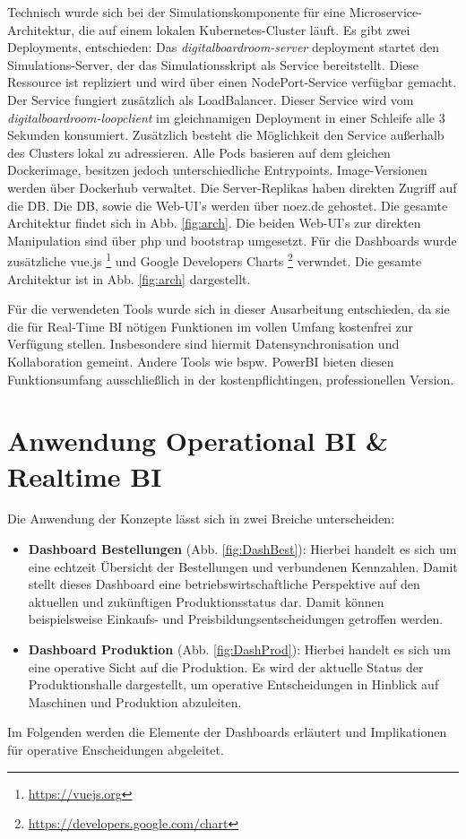 Technisch wurde sich bei der Simulationskomponente für eine Microservice-Architektur, die auf einem lokalen Kubernetes-Cluster läuft. Es gibt zwei Deployments, entschieden: Das \textit{digitalboardroom-server} deployment startet den Simulations-Server, der das Simulationsskript als Service bereitstellt. Diese Ressource ist repliziert und wird über einen NodePort-Service verfügbar gemacht. Der Service fungiert zusätzlich als LoadBalancer. Dieser Service wird vom \textit{digitalboardroom-loopclient} im gleichnamigen Deployment in einer Schleife alle 3 Sekunden konsumiert. Zusätzlich besteht die Möglichkeit den Service außerhalb des Clusters lokal zu adressieren. Alle Pods basieren auf dem gleichen Dockerimage, besitzen jedoch unterschiedliche Entrypoints. Image-Versionen werden über Dockerhub verwaltet. Die Server-Replikas haben direkten Zugriff auf die \ac{DB}.
Die \ac{DB}, sowie die Web-UI's werden über noez.de gehostet. Die gesamte Architektur findet sich in Abb. \ref{fig:arch}. Die beiden Web-UI's zur direkten Manipulation sind über php und bootstrap umgesetzt. Für die Dashboards wurde zusätzliche vue.js \footnote{\url{https://vuejs.org}} und Google Developers Charts \footnote{\url{https://developers.google.com/chart}} verwndet. Die gesamte Architektur ist in Abb. \ref{fig:arch} dargestellt.

Für die verwendeten Tools wurde sich in dieser Ausarbeitung entschieden, da sie die für Real-Time \ac{BI} nötigen Funktionen im vollen Umfang kostenfrei zur Verfügung stellen. Insbesondere sind hiermit Datensynchronisation und Kollaboration gemeint. Andere Tools wie bspw. PowerBI bieten diesen Funktionsumfang ausschließlich in der kostenpflichtingen, professionellen Version.

\section{Anwendung Operational BI \& Realtime BI} \label{abs:anwOP}
Die Anwendung der Konzepte lässt sich in zwei Breiche unterscheiden:
\begin{itemize}
    \item \textbf{Dashboard Bestellungen} (Abb. \ref{fig:DashBest}): Hierbei handelt es sich um eine echtzeit Übersicht der Bestellungen und verbundenen Kennzahlen. Damit stellt dieses Dashboard eine betriebswirtschaftliche Perspektive auf den aktuellen und zukünftigen Produktionsstatus dar. Damit können beispielsweise Einkaufs- und Preisbildungsentscheidungen getroffen werden.
    \item \textbf{Dashboard Produktion} (Abb. \ref{fig:DashProd}): Hierbei handelt es sich um eine operative Sicht auf die Produktion. Es wird der aktuelle Status der Produktionshalle dargestellt, um operative Entscheidungen in Hinblick auf Maschinen und Produktion abzuleiten.
\end{itemize}
Im Folgenden werden die Elemente der Dashboards erläutert und Implikationen für operative Enscheidungen abgeleitet.

